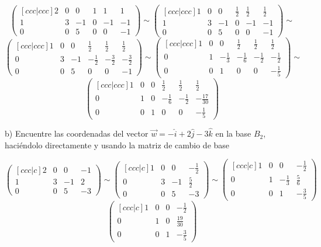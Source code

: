 \documentclass[12pt]{article}
\begin{document}
$$
\begin{pmatrix}[ccc|ccc] 2 & 0 & 0 & 1 & 1 & 1\\ 1 & 3 & -1 & 0 & -1 & -1\\ 0 & 0 & 5 & 0 & 0 & -1 \end{pmatrix} 
\sim
\begin{pmatrix}[ccc|ccc] 1 & 0 & 0 & \frac{1}{2} & \frac{1}{2} & \frac{1}{2}\\ 1 & 3 & -1 & 0 & -1 & -1\\ 0 & 0 & 5 & 0 & 0 & -1 \end{pmatrix} \sim
$$
$$
\begin{pmatrix}[ccc|ccc] 1 & 0 & 0 & \frac{1}{2} & \frac{1}{2} & \frac{1}{2}\\ 0 & 3 & -1 & -\frac{1}{2} & -\frac{3}{2} & -\frac{3}{2}\\ 0 & 0 & 5 & 0 & 0 & -1 \end{pmatrix} 
\sim
\begin{pmatrix}[ccc|ccc] 1 & 0 & 0 & \frac{1}{2} & \frac{1}{2} & \frac{1}{2}\\ 0 & 1 & -\frac{1}{3} & -\frac{1}{6} & -\frac{1}{2} & -\frac{1}{2}\\ 0 & 0 & 1 & 0 & 0 & -\frac{1}{5} \end{pmatrix}
\sim
$$
$$
\begin{pmatrix}[ccc|ccc] 1 & 0 & 0 & \frac{1}{2} & \frac{1}{2} & \frac{1}{2}\\ 0 & 1 & 0 & -\frac{1}{6} & -\frac{1}{2} & -\frac{17}{30}\\ 0 & 0 & 1 & 0 & 0 & -\frac{1}{5} \end{pmatrix}
$$
\bigskip

b) Encuentre las coordenadas del vector
$\Vec{w} = -\hat{i} + 2\hat{j} - 3\hat{k}$ en la base $B_{2}$, haciéndolo directamente y usando la matriz de cambio de base
\bigskip

$$\begin{pmatrix}[ccc|c] 2 & 0 & 0 & -1\\ 1 & 3 & -1 & 2\\ 0 & 0 & 5 & -3 \end{pmatrix} 
\sim
\begin{pmatrix}[ccc|c] 1 & 0 & 0 & -\frac{1}{2}\\ 0 & 3 & -1 & \frac{5}{2}\\ 0 & 0 & 5 & -3 \end{pmatrix}
\sim
\begin{pmatrix}[ccc|c] 1 & 0 & 0 & -\frac{1}{2}\\ 0 & 1 & -\frac{1}{3} & \frac{5}{6}\\ 0 & 0 & 1 & -\frac{3}{5} \end{pmatrix}
$$
$$
\begin{pmatrix}[ccc|c] 1 & 0 & 0 & -\frac{1}{2}\\ 0 & 1 & 0 & \frac{19}{30}\\ 0 & 0 & 1 & -\frac{3}{5} \end{pmatrix}
$$
\end{document}
